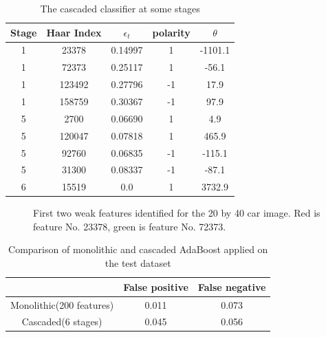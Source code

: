 \documentclass[12pt]{article}
\begin{document}
\begin{table}[!h]
\centering
\begin{tabular}{|c|c|c|c|c|}
\hline
Stage & Haar Index & $\epsilon_t$ & polarity & $\theta$ \\
\hline
1 & 23378 & 0.14997 & 1 & -1101.1 \\
\hline
1 & 72373 & 0.25117 & 1 & -56.1\\
\hline
1 & 123492 & 0.27796 & -1 & 17.9\\
\hline
1 & 158759 & 0.30367 & -1 & 97.9\\
\hline
5 & 2700 & 0.06690 & 1 & 4.9\\
\hline
5 & 120047 & 0.07818 & 1 & 465.9 \\
\hline
5 & 92760 & 0.06835 & -1 & -115.1 \\
\hline
5 & 31300 & 0.08337 & -1 & -87.1\\
\hline
6 & 15519 & 0.0 & 1 & 3732.9 \\
\hline
\end{tabular}
\caption{The cascaded classifier at some stages\label{tabcas}}
\end{table}

\begin{figure}[!h]
\centering
{}
\caption{First two weak features identified for the 20 by 40 car image. Red is feature No. 23378, green is feature No. 72373.\label{carweak}}
\end{figure}

\begin{table}[!h]
\centering
\begin{tabular}{|c|c|c|}
\hline
 & False positive & False negative\\
\hline
Monolithic(200 features) & 0.011 & 0.073 \\
\hline
Cascaded(6 stages) & 0.045 & 0.056\\
\hline
\end{tabular}
\caption{Comparison of monolithic and cascaded AdaBoost applied on the test dataset\label{tabmono}}
\end{table}
\nocite{*}


\end{document}
